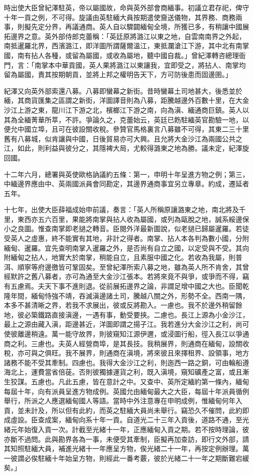 \begin{pinyinscope}
時出使大臣曾紀澤駐英，帝以屬國故，命與英外部會商緬事。初議立君存祀，俾守十年一貢之例，不可得。旋議由英駐緬大員按期遣使齎送儀物，其界務、商務兩事，則擬先定分界，再議通商。英人自以驟闢緬甸全境，所獲已多，有稍讓中國展拓邊界之意。英外部侍郎克蕾稱：「英廷原將潞江以東之地，自雲南南界之外起，南抵暹羅北界，西濱潞江，即洋圖所謂薩爾溫江，東抵瀾滄江下游，其中北有南掌國，南有拈人各種，或留為屬國，或收為屬地，聽中國自裁。」曾紀澤轉咨總理衙門，言：「南掌本中華貢國，英人果將潞江以東讓我，宜即受之，將拈人、南掌均留為屬國，責其按期朝貢，並將上邦之權明告天下，方可防後患而固邊圉。」

紀澤又向英外部索還八募。八募即蠻幕之新街。昔時蠻幕土司地甚大，後悉並於緬，其商貨匯集之區謂之新街，洋圖譯音則為八募，距騰越邊外百數十里，在大金沙江上游之東，龍川江下游之北，檳榔江下游之南，向為滇、緬通商巨鎮。英人以其為全緬菁華所萃，不許。爭論久之，克蕾始云，英廷已飭駐緬英官勘驗一地，以便允中國立埠，且可在彼設關收稅。參贊官馬格裏言八募雖不可得，其東二三十里舊有八募城，似肯讓與中國，日後貿易亦可大興。且允將大金沙江為兩國公共之江，如此，則利益與彼分之，其隱裨大局，尤較得潞東之地為勝。議未定，紀澤旋回國。

十二年六月，總署與英使歐格訥議約五條：第一，申明十年呈進方物之例；第三，中緬邊界應由中、英兩國派員會同勘定，其邊界通商事宜另立專章。約成，遷延者五年。

十七年，出使大臣薛福成始申前議，奏言：「英人所稱原讓潞東之地，南北將及千里，東西亦五六百里，果能將南掌與拈人收為屬國，或列為甌脫之地，誠系綏邊保小之良圖。惟查南掌即老撾之轉音。臣閱外洋最新圖說，似老撾已歸屬暹羅。若徒受英人之虛惠，終不能實有其地，非計之得者。南掌、拈人本各判為數小國，分附緬甸、暹羅。宜先查明南掌入暹羅之外，是否尚有自立之國，以定受與不受。其向附緬甸之拈人，地實大於南掌，稍能自立，且素服中國之化。若收為我屬，則普洱、順寧等府邊徼皆可鞏固矣。至曾紀澤所索八募之地，雖為英人所不肯舍，其曾經默許之舊八募者，亦可為通至大金沙江張本。若將來竟不與爭，或爭而不得，竊有五慮焉。夫天下事不進則退。從前展拓邊界之論，非謂足增中國之大也。臣聞乾隆年間，緬甸恃強不靖，吞滅滇邊諸土司，騰越八關之外，形勢不全。西南一隅，本多不甚清晰之界，若我不求展出，彼或反將勘入。一慮也。我不於邊外稍留餘地，彼必築鐵路直接滇邊，一遇有事，動受要挾。二慮也。長江上源為小金沙江，最上之源由藏入滇，距邊甚近，洋圖即謂之揚子江。我若進分大金沙江之利，尚可使彼離邊稍遠。萬一能守故界，則彼窺知江源伊邇，或浸圖行船，徑入長江以爭通商之利。三慮也。夫英人經營商埠，是其長技。我稍展界，則通商在緬甸，設關收稅，亦可與之俱旺。我不展界，則通商在滇境，將來彼且來擇租界、設領事，地方諸務不能不受其牽制。四慮也。我得大金沙江之利，則迤西一路之銅，可由輪船遵海北上，運費當省倍蓰。否則彼獨據運貨之利，既入滇境，窺知礦產之富，或且漸生狡謀。五慮也。凡此五慮，皆在意計之中。又查中、英所定緬約第一條內，緬甸每屆十年，向有派員呈進方物成例。英國允由緬甸最大之大臣，每屆十年派員循例舉行，所派之人應選緬甸國人等語。當時中外注意專在申明成例，惟緬甸何年入貢，並未計及，所以但有此約，而英之駐緬大員尚未舉行。竊恐久不催問，此約即成虛設。臣查成案，緬甸向系十年一貢。自道光二十三年入貢後，道路不通，至光緒元年始復入貢一次。計截至光緒十一年，正應緬甸入貢之期。若不按時理論，彼亦斷不過問。此與勘界各為一事，未便受其牽制，臣擬再加查訪，即行文外部，請其知照駐緬大員，補進光緒十一年應呈方物，俟光緒二十一年，再按定例辦理。萬一彼謂必俟駐緬十年始呈方物，則經此一番考覈，彼於光緒二十一年之期斷難宕緩矣。」


\end{pinyinscope}
